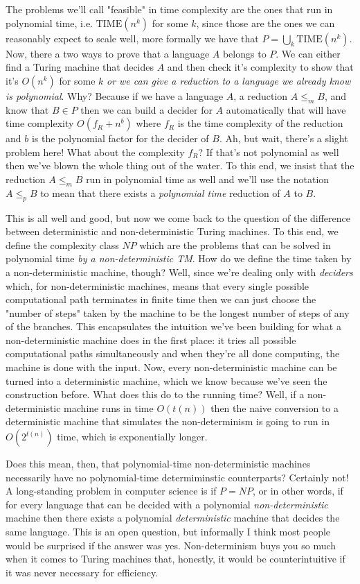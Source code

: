 \documentclass[11pt]{article}
\begin{document}
The problems we'll call "feasible" in time complexity are the ones that run in polynomial time, i.e. $\text{TIME}(n^k)$ for some $k$, since those are the ones we can reasonably expect to scale well, more formally we have that $P = \bigcup_k \text{TIME}(n^k)$. Now, there a two ways to prove that a language $A$ belongs to $P$. We can either find a Turing machine that decides $A$ and then check it's complexity to show that it's $O(n^k)$ for some $k$ \emph{or we can give a reduction to a language we already know is polynomial}. Why? Because if we have a language $A$, a reduction $A \le_m B$, and know that $B \in P$ then we can build a decider for $A$ automatically that will have time complexity $O(f_R + n^b)$ where $f_R$ is the time complexity of the reduction and $b$ is the polynomial factor for the decider of $B$. Ah, but wait, there's a slight problem here! What about the complexity $f_R$? If that's not polynomial as well then we've blown the whole thing out of the water. To this end, we insist that the reduction $A \le_m B$ run in polynomial time as well and we'll use the notation $A \le_p B$ to mean that there exists a \emph{polynomial time} reduction of $A$ to $B$.

This is all well and good, but now we come back to the question of the difference between deterministic and non-deterministic Turing machines. To this end, we define the complexity class $NP$ which are the problems that can be solved in polynomial time \emph{by a non-deterministic TM}. How do we define the time taken by a non-deterministic machine, though? Well, since we're dealing only with \emph{deciders} which, for non-deterministic machines, means that every single possible computational path terminates in finite time then we can just choose the "number of steps" taken by the machine to be the longest number of steps of any of the branches. This encapsulates the intuition we've been building for what a non-deterministic machine does in the first place: it tries all possible computational paths simultaneously and when they're all done computing, the machine is done with the input. Now, every non-deterministic machine can be turned into a deterministic machine, which we know because we've seen the construction before. What does this do to the running time? Well, if a non-deterministic machine runs in time $O(t(n))$ then the naive conversion to a deterministic machine that simulates the non-determinism is going to run in $O(2^{t(n)})$ time, which is exponentially longer. 

Does this mean, then, that polynomial-time non-deterministic machines necessarily have no polynomial-time determiminstic counterparts? Certainly not! A long-standing problem in computer science is if $P = NP$, or in other words, if for every language that can be decided with a polynomial \emph{non-deterministic} machine then there exists a polynomial \emph{deterministic} machine that decides the same language. This is an open question, but informally I think most people would be surprised if the answer was yes. Non-determinism buys you so much when it comes to Turing machines that, honestly, it would be counterintuitive if it was never necessary for efficiency.
\end{document}
